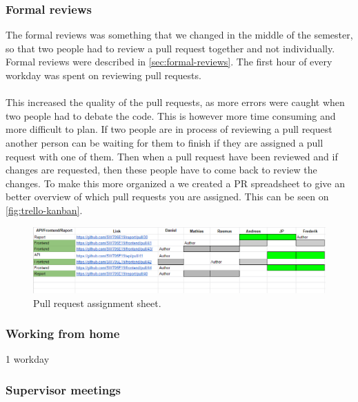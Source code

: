 \subsubsection{Formal reviews}
The formal reviews was something that we changed in the middle of the semester, so that two people had to review a pull request together and not individually.
Formal reviews were described in \autoref{sec:formal-reviews}.
The first hour of every workday was spent on reviewing pull requests.
\\\\
This increased the quality of the pull requests, as more errors were caught when two people had to debate the code.
This is however more time consuming and more difficult to plan.
If two people are in process of reviewing a pull request another person can be waiting for them to finish if they are assigned a pull request with one of them. 
Then when a pull request have been reviewed and if changes are requested, then these people have to come back to review the changes.
To make this more organized a we created a PR spreadsheet to give an better overview of which pull requests you are assigned.
This can be seen on \autoref{fig:trello-kanban}.
\begin{figure}[H]
    \centering
    \includegraphics[width=\linewidth]{figures/formal-reviews.PNG}
    \caption{Pull request assignment sheet.}
    \label{fig:trello-kanban}
\end{figure}

\subsubsection{Working from home}
1 workday

\subsubsection{Supervisor meetings}


